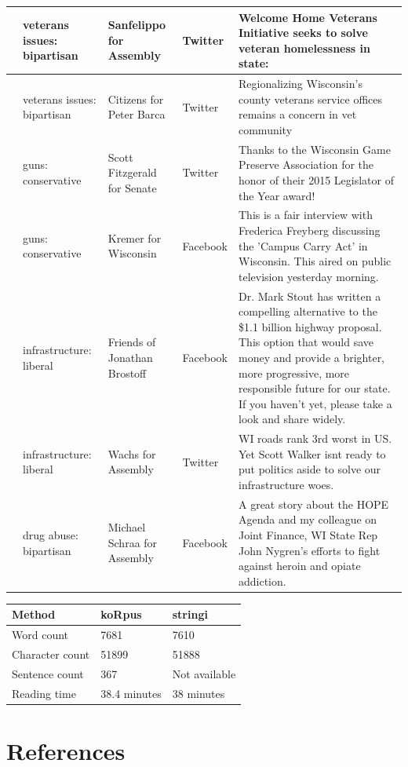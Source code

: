 \documentclass[12pt,]{article}
\begin{document}
\begin{longtable}[t]{>{\raggedright\arraybackslash}p{.65in}|>{\raggedright\arraybackslash}p{.6in}|>{\raggedright\arraybackslash}p{.7in}|>{\raggedright\arraybackslash}p{.6in}|>{\raggedright\arraybackslash}p{3in}}
\hline
6 & veterans issues: bipartisan & Sanfelippo for Assembly & Twitter & Welcome Home Veterans Initiative seeks to solve veteran homelessness in state:\\
\hline
7 & veterans issues: bipartisan & Citizens for Peter Barca & Twitter & Regionalizing Wisconsin's county veterans service offices remains a concern in vet community\\
\hline
8 & guns: conservative & Scott Fitzgerald for Senate & Twitter & Thanks to the Wisconsin Game Preserve Association for the honor of their 2015 Legislator of the Year award!\\
\hline
9 & guns: conservative & Kremer for Wisconsin & Facebook & This is a fair interview with Frederica Freyberg discussing the 'Campus Carry Act' in Wisconsin.  This aired on public television yesterday morning.\\
\hline
10 & infrastructure: liberal & Friends of Jonathan Brostoff & Facebook & Dr. Mark Stout has written a compelling alternative to the \$1.1 billion highway proposal. This option that would save money and provide a brighter, more progressive, more responsible future for our state. If you haven't yet, please take a look and share widely.\\
\hline
11 & infrastructure: liberal & Wachs for Assembly & Twitter & WI roads rank 3rd worst in US. Yet Scott Walker isnt ready to put politics aside to solve our infrastructure woes.\\
\hline
12 & drug abuse: bipartisan & Michael Schraa for Assembly & Facebook & A great story about the HOPE Agenda and my colleague on Joint Finance, WI State Rep John Nygren's efforts to fight against heroin and opiate addiction.\\
\hline
\end{longtable}

\begin{tabular}{l|l|l}
\hline
Method & koRpus & stringi\\
\hline
Word count & 7681 & 7610\\
\hline
Character count & 51899 & 51888\\
\hline
Sentence count & 367 & Not available\\
\hline
Reading time & 38.4 minutes & 38 minutes\\
\hline
\end{tabular}

\hypertarget{references}{%
\section*{References}\label{references}}
\end{document}
